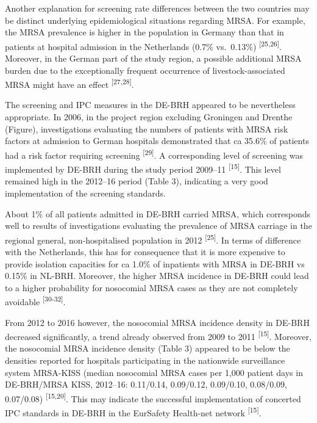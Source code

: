 \documentclass[
]{book}
\begin{document}
Another explanation for screening rate differences between the two countries may be distinct underlying epidemiological situations regarding MRSA. For example, the MRSA prevalence is higher in the population in Germany than that in patients at hospital admission in the Netherlands (0.7\% vs.~0.13\%) \textsuperscript{{[}25,26{]}}. Moreover, in the German part of the study region, a possible additional MRSA burden due to the exceptionally frequent occurrence of livestock-associated MRSA might have an effect \textsuperscript{{[}27,28{]}}.

The screening and IPC measures in the DE-BRH appeared to be nevertheless appropriate. In 2006, in the project region excluding Groningen and Drenthe (Figure), investigations evaluating the numbers of patients with MRSA risk factors at admission to German hospitals demonstrated that ca 35.6\% of patients had a risk factor requiring screening \textsuperscript{{[}29{]}}. A corresponding level of screening was implemented by DE-BRH during the study period 2009--11 \textsuperscript{{[}15{]}}. This level remained high in the 2012--16 period (Table 3), indicating a very good implementation of the screening standards.

About 1\% of all patients admitted in DE-BRH carried MRSA, which corresponds well to results of investigations evaluating the prevalence of MRSA carriage in the regional general, non-hospitalised population in 2012 \textsuperscript{{[}25{]}}. In terms of difference with the Netherlands, this has for consequence that it is more expensive to provide isolation capacities for ca 1.0\% of inpatients with MRSA in DE-BRH vs 0.15\% in NL-BRH. Moreover, the higher MRSA incidence in DE-BRH could lead to a higher probability for nosocomial MRSA cases as they are not completely avoidable \textsuperscript{{[}30-32{]}}.

From 2012 to 2016 however, the nosocomial MRSA incidence density in DE-BRH decreased significantly, a trend already observed from 2009 to 2011 \textsuperscript{{[}15{]}}. Moreover, the nosocomial MRSA incidence density (Table 3) appeared to be below the densities reported for hospitals participating in the nationwide surveillance system MRSA-KISS (median nosocomial MRSA cases per 1,000 patient days in DE-BRH/MRSA KISS, 2012--16: 0.11/0.14, 0.09/0.12, 0.09/0.10, 0.08/0.09, 0.07/0.08) \textsuperscript{{[}15,20{]}}. This may indicate the successful implementation of concerted IPC standards in DE-BRH in the EurSafety Health-net network \textsuperscript{{[}15{]}}.
\end{document}
